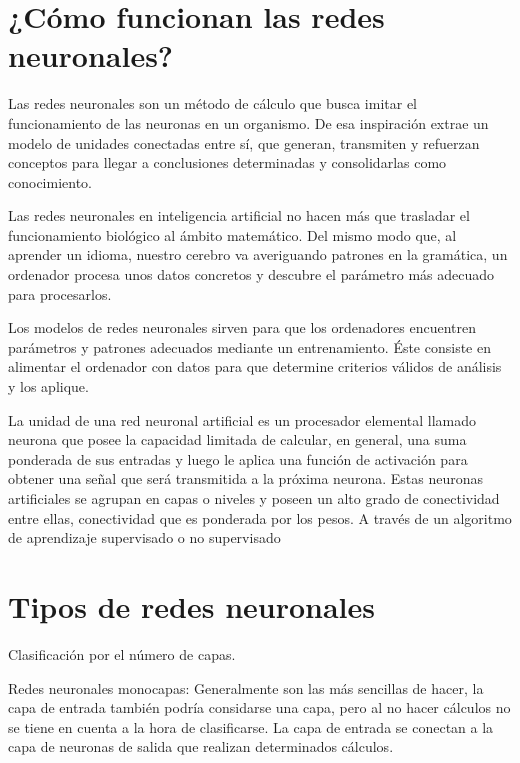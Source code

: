\documentclass[letterpaper,12pt]{article}
\begin{document}
\section{¿Cómo funcionan las redes neuronales?}
Las redes neuronales son un método de cálculo que busca imitar el funcionamiento de las neuronas en un organismo. De esa inspiración extrae un modelo de unidades conectadas entre sí, que generan, transmiten y refuerzan conceptos para llegar a conclusiones determinadas y consolidarlas como conocimiento. 

Las redes neuronales en inteligencia artificial no hacen más que trasladar el funcionamiento biológico al ámbito matemático. Del mismo modo que, al aprender un idioma, nuestro cerebro va averiguando patrones en la gramática, un ordenador procesa unos datos concretos y descubre el parámetro más adecuado para procesarlos.

Los modelos de redes neuronales sirven para que los ordenadores encuentren parámetros y patrones adecuados mediante un entrenamiento. Éste consiste en alimentar el ordenador con datos para que determine criterios válidos de análisis y los aplique.

La unidad de una red neuronal artificial es un procesador elemental llamado neurona que posee la capacidad limitada de calcular, en general, una suma ponderada de sus entradas y luego le aplica una función de activación para obtener una señal que será transmitida a la próxima neurona. Estas neuronas artificiales se agrupan en capas o niveles y poseen un alto grado de conectividad entre ellas, conectividad que es ponderada por los pesos. A través de un algoritmo de aprendizaje supervisado o no supervisado

\newpage

\section{Tipos de redes neuronales}

Clasificación por el número de capas.\newline

Redes neuronales monocapas:\newline 
Generalmente son las más sencillas de hacer, la capa de entrada también podría considarse una capa, pero al no hacer cálculos no se tiene en cuenta a la hora de clasificarse. La capa de entrada se conectan a la capa de neuronas de salida que realizan determinados cálculos.\newline
\end{document}
